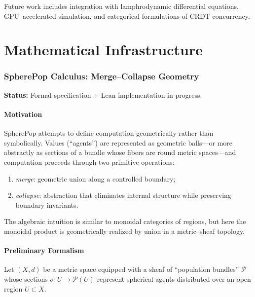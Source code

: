 \documentclass[12pt]{article}
\theoremstyle{plain}
\theoremstyle{definition}
\theoremstyle{remark}
\begin{document}
Future work includes integration with lamphrodynamic differential equations,
GPU--accelerated simulation, and categorical formulations of CRDT concurrency.

\newpage

\part{Mathematical Infrastructure}

\section{SpherePop Calculus: Merge--Collapse Geometry}

\textbf{Status:} Formal specification + Lean implementation in progress.

\subsection{Motivation}

SpherePop attempts to define computation geometrically rather than symbolically.
Values (``agents'') are represented as geometric balls---or more abstractly as
sections of a bundle whose fibers are round metric spaces---and computation
proceeds through two primitive operations:

\begin{enumerate}
    \item \textit{merge}: geometric union along a controlled boundary;
    \item \textit{collapse}: abstraction that eliminates internal structure
    while preserving boundary invariants.
\end{enumerate}

The algebraic intuition is similar to monoidal categories of regions, but here
the monoidal product is geometrically realized by union in a metric--sheaf
topology.


\subsection{Preliminary Formalism}

Let $(X,d)$ be a metric space equipped with a sheaf of ``population bundles''
$\mathcal{P}$ whose sections $\sigma : U \to \mathcal{P}(U)$ represent spherical
agents distributed over an open region $U \subset X$. 
\end{document}
